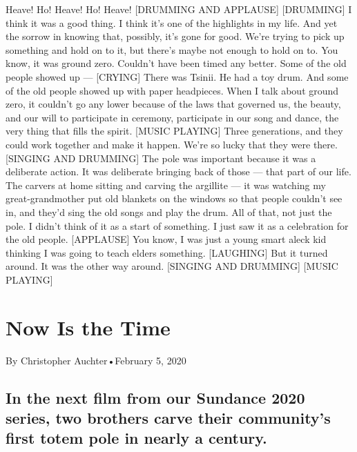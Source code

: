 \begin{itemize}
  Heave! Ho! Heave! Ho! Heave! {[}DRUMMING AND APPLAUSE{]}
  {[}DRUMMING{]} I think it was a good thing. I think it's one of the
  highlights in my life. And yet the sorrow in knowing that, possibly,
  it's gone for good. We're trying to pick up something and hold on to
  it, but there's maybe not enough to hold on to. You know, it was
  ground zero. Couldn't have been timed any better. Some of the old
  people showed up --- {[}CRYING{]} There was Tsinii. He had a toy drum.
  And some of the old people showed up with paper headpieces. When I
  talk about ground zero, it couldn't go any lower because of the laws
  that governed us, the beauty, and our will to participate in ceremony,
  participate in our song and dance, the very thing that fills the
  spirit. {[}MUSIC PLAYING{]} Three generations, and they could work
  together and make it happen. We're so lucky that they were there.
  {[}SINGING AND DRUMMING{]} The pole was important because it was a
  deliberate action. It was deliberate bringing back of those --- that
  part of our life. The carvers at home sitting and carving the
  argillite --- it was watching my great-grandmother put old blankets on
  the windows so that people couldn't see in, and they'd sing the old
  songs and play the drum. All of that, not just the pole. I didn't
  think of it as a start of something. I just saw it as a celebration
  for the old people. {[}APPLAUSE{]} You know, I was just a young smart
  aleck kid thinking I was going to teach elders something.
  {[}LAUGHING{]} But it turned around. It was the other way around.
  {[}SINGING AND DRUMMING{]} {[}MUSIC PLAYING{]}
\end{itemize}

\hypertarget{now-is-the-time-1}{%
\section{Now Is the Time}\label{now-is-the-time-1}}

By Christopher Auchter•February 5, 2020

\hypertarget{in-the-next-film-from-our-sundance-2020-series-two-brothers-carve-their-communitys-first-totem-pole-in-nearly-a-century-1}{%
\subsection{In the next film from our Sundance 2020 series, two brothers
carve their community's first totem pole in nearly a
century.}\label{in-the-next-film-from-our-sundance-2020-series-two-brothers-carve-their-communitys-first-totem-pole-in-nearly-a-century-1}}

